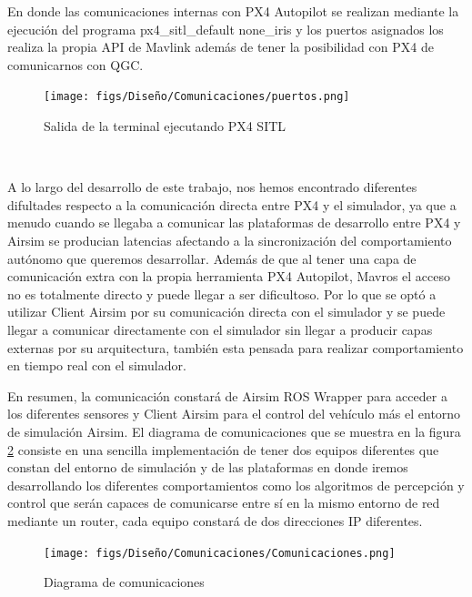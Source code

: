 En donde las comunicaciones internas con PX4 Autopilot se realizan mediante la ejecución del programa px4\_sitl\_default none\_iris y los puertos asignados los realiza la propia
API de Mavlink además de tener la posibilidad con PX4 de comunicarnos con QGC.

\begin{figure} [H]
  \begin{center}
    \texttt{[image: figs/Diseño/Comunicaciones/puertos.png]}
  \end{center}
  \caption{Salida de la terminal ejecutando PX4 SITL}
  \label{fig:SalidaTerminal}
\end{figure}\

A lo largo del desarrollo de este trabajo, nos hemos encontrado diferentes difultades respecto a la comunicación directa entre PX4 y el simulador, ya que a menudo cuando se llegaba a 
comunicar las plataformas de desarrollo entre PX4 y Airsim se producian latencias afectando a la sincronización del comportamiento autónomo que queremos desarrollar. Además de que al tener
una capa de comunicación extra con la propia herramienta PX4 Autopilot, Mavros el acceso no es totalmente directo y puede llegar a ser dificultoso. Por lo que se optó a utilizar 
Client Airsim por su comunicación directa con el simulador y se puede llegar a comunicar directamente con el simulador sin llegar a producir capas externas por su arquitectura, también
esta pensada para realizar comportamiento en tiempo real con el simulador.  \newline

En resumen, la comunicación constará de Airsim ROS Wrapper para acceder a los diferentes sensores y Client Airsim para el control del vehículo más el entorno
de simulación Airsim. El diagrama de comunicaciones que se muestra en la figura \ref{fig:diagramadeAirsim} consiste en una sencilla implementación de tener dos equipos diferentes que
constan del entorno de simulación y de las plataformas en donde iremos desarrollando los diferentes comportamientos como los algoritmos de percepción y control que serán capaces
de comunicarse entre sí en la mismo entorno de red mediante un router, cada equipo constará de dos direcciones IP diferentes. 

\begin{figure} [H]
  \begin{center}
    \texttt{[image: figs/Diseño/Comunicaciones/Comunicaciones.png]}
  \end{center}
  \caption{Diagrama de comunicaciones}
  \label{fig:diagramadeAirsim}
\end{figure}\

